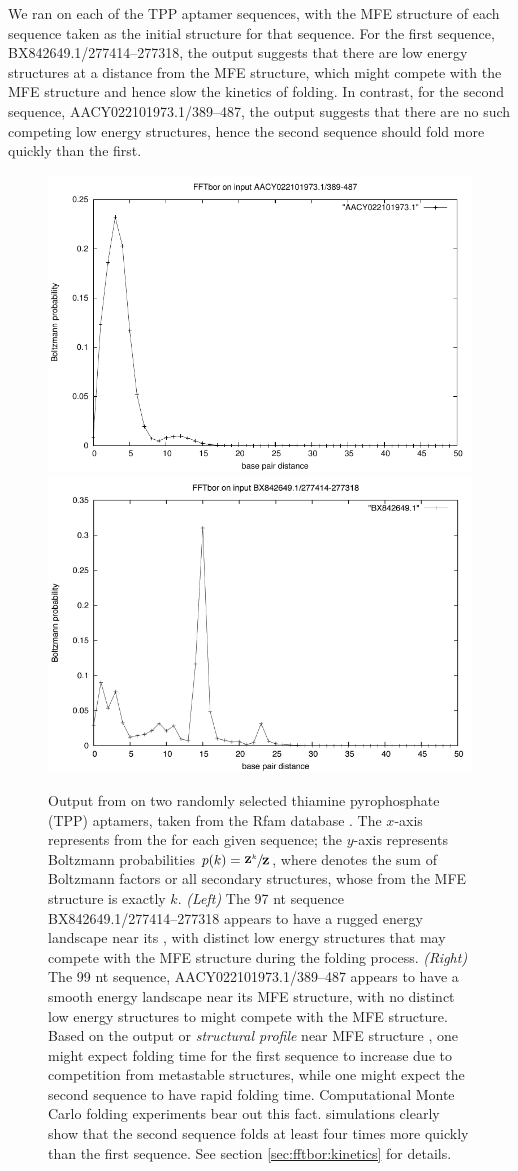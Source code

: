 We ran \fftbor on each of the TPP \rb aptamer
sequences, with the MFE structure of each
sequence taken as the initial structure \strSt for that sequence. For the
first sequence, BX842649.1/277414--277318, the \fftbor output
suggests that there are low energy structures
at a distance from the MFE structure, which might compete with the MFE
structure and hence slow the kinetics of folding. In contrast, for the
second sequence, AACY022101973.1/389--487, the \fftbor output suggests
that there are no such competing low energy structures, hence
the second sequence should fold more quickly than the first.

\begin{figure}[!ht]
\centering
\includegraphics[width=.45\textwidth]{Figures/FFTbor/FFTbor_AACY022101973_1.pdf}
\quad
\includegraphics[width=.45\textwidth]{Figures/FFTbor/FFTbor_BX842649_1.pdf}
\caption[Output from \fftbor on two randomly selected
thiamine pyrophosphate \rb (TPP) aptamers]{Output from \fftbor on two randomly selected
thiamine pyrophosphate \rb (TPP) aptamers, taken from the Rfam database
\citep{Gardner.nar11}. The $x$-axis represents \bpd from the
\mfes for each given sequence; the $y$-axis represents
Boltzmann probabilities $p(k) = \sfrac{{\bf Z}^{k}_{}}{{\bf Z}^{}_{}}$, where
 denotes the sum of Boltzmann factors or all secondary structures,
whose \bpd from the MFE structure is exactly $k$.
{\em (Left)}
The 97 nt sequence BX842649.1/277414--277318 appears to have a rugged energy
landscape near its \mfes, with distinct
low energy structures that may compete with the MFE structure during the
folding process.
{\em (Right)}
The 99 nt sequence, AACY022101973.1/389--487 appears to have a smooth energy
landscape near its MFE structure, with no distinct low energy structures
to might compete with the MFE structure.
Based on the \fftbor output or {\em structural profile} near MFE
structure \strSt, one might expect
folding time for the first sequence to increase due to competition from
metastable structures, while one might expect the second sequence to have
rapid folding time.
Computational Monte Carlo folding experiments bear out this fact.
\kinfold \citep{flamm} simulations clearly show that the second
sequence folds
at least four times more quickly than the first sequence. See section
\ref{sec:fftbor:kinetics} for
details.}
\label{fig:fftbor:tppDistributions}
\end{figure}

